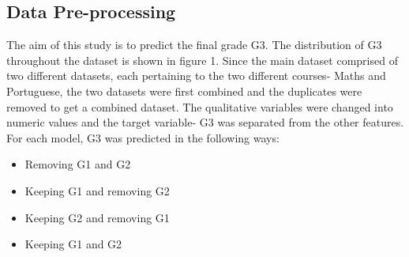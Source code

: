 \documentclass[conference]{IEEEtran}
\begin{document}
\subsection{Data Pre-processing}
The aim of this study is to predict the final grade G3. The distribution of G3 throughout the dataset is shown in figure 1.
Since the main dataset comprised of two different datasets, each pertaining to the two different courses- Maths and Portuguese, the two datasets were first combined and the duplicates were removed to get a combined dataset. The qualitative variables were changed into numeric values and the target variable- G3 was separated from the other features. \\
For each model, G3 was predicted in the following ways:
\begin{itemize}
    \item Removing G1 and G2
    \item Keeping G1 and removing G2
    \item Keeping G2 and removing G1
    \item Keeping G1 and G2
\end{itemize}
\end{document}
